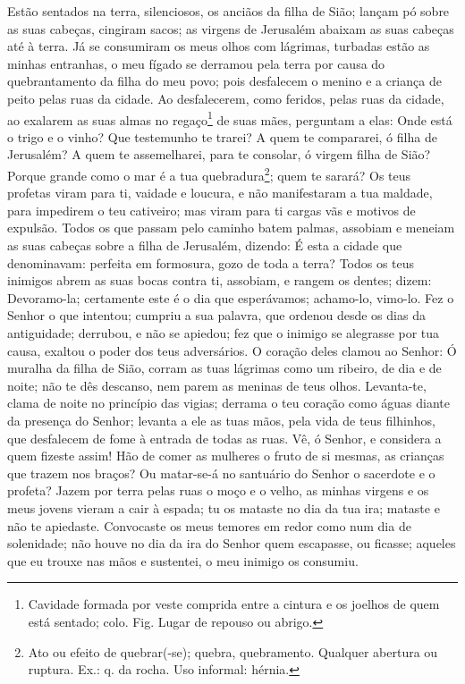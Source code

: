 Estão sentados na terra, silenciosos, os anciãos da filha de
Sião; lançam pó sobre as suas cabeças, cingiram sacos; as virgens de
Jerusalém abaixam as suas cabeças até à terra. Já se
consumiram os meus olhos com lágrimas, turbadas estão as minhas
entranhas, o meu fígado se derramou pela terra por causa do
quebrantamento da filha do meu povo; pois desfalecem o menino e a
criança de peito pelas ruas da cidade. Ao desfalecerem, como
feridos, pelas ruas da cidade, ao exalarem as suas almas no
regaço\footnote{Cavidade formada por veste comprida entre a cintura
e os joelhos de quem está sentado; colo. Fig.  Lugar de repouso ou
abrigo.} de suas mães, perguntam a elas: Onde está o trigo e o
vinho? Que testemunho te trarei? A quem te compararei, ó
filha de Jerusalém? A quem te assemelharei, para te consolar, ó
virgem filha de Sião? Porque grande como o mar é a tua
quebradura\footnote{Ato ou efeito de quebrar(-se); quebra,
quebramento. Qualquer abertura ou ruptura. Ex.: q. da rocha. Uso
informal: hérnia.}; quem te sarará? Os teus profetas viram
para ti, vaidade e loucura, e não manifestaram a tua maldade, para
impedirem o teu cativeiro; mas viram para ti cargas vãs e motivos de
expulsão. Todos os que passam pelo caminho batem palmas,
assobiam e meneiam as suas cabeças sobre a filha de Jerusalém,
dizendo: É esta a cidade que denominavam: perfeita em formosura,
gozo de toda a terra? Todos os teus inimigos abrem as suas
bocas contra ti, assobiam, e rangem os dentes; dizem: Devoramo-la;
certamente este é o dia que esperávamos; achamo-lo, vimo-lo.
Fez o Senhor  o que intentou; cumpriu a sua palavra, que
ordenou desde os dias da antiguidade; derrubou, e não se apiedou;
fez que o inimigo se alegrasse por tua causa, exaltou o poder dos
teus adversários. O coração deles clamou ao Senhor: Ó muralha
da filha de Sião, corram as tuas lágrimas como um ribeiro, de dia e
de noite; não te dês descanso, nem parem as meninas de teus olhos.
Levanta-te, clama de noite no princípio das vigias; derrama o
teu coração como águas diante da presença do Senhor; levanta a ele
as tuas mãos, pela vida de teus filhinhos, que desfalecem de fome à
entrada de todas as ruas. Vê, ó Senhor, e considera a quem
fizeste assim! Hão de comer as mulheres o fruto de si mesmas, as
crianças que trazem nos braços? Ou matar-se-á no santuário do Senhor
o sacerdote e o profeta? Jazem por terra pelas ruas o moço e
o velho, as minhas virgens e os meus jovens vieram a cair à espada;
tu os mataste no dia da tua ira; mataste e não te apiedaste.
Convocaste os meus temores em redor como num dia de
solenidade; não houve no dia da ira do Senhor  quem escapasse, ou
ficasse; aqueles que eu trouxe nas mãos e sustentei, o meu inimigo
os consumiu.

